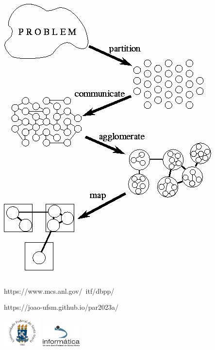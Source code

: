 \documentclass[xcolor={usenames,dvipsnames},12pt,presentation,aspectratio=169]{beamer}
\begin{document}
\begin{frame}
\begin{columns}
\begin{column}{0.4\textwidth}
\begin{center}
        \includegraphics[width=\textwidth]{pcam.png}
        \end{center}
     \end{column}
   \end{columns}
  {\tiny https://www.mcs.anl.gov/~itf/dbpp/}
\end{frame}
\begin{frame}[plain]{}
  \begin{center}
    \vspace{2cm}
    \Large{https://joao-ufsm.github.io/par2023a/}
    
    \vspace{1cm}
    \includegraphics[width=2cm]{logo_ufsm}
    \hspace{0.5cm}
    \includegraphics[width=2cm]{logo_inf}
  \end{center}
\end{frame}
\end{document}

